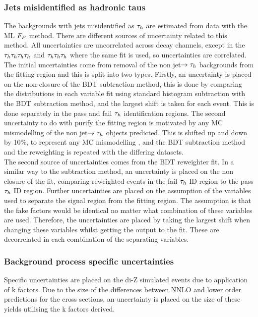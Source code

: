 \subsubsection{Jets misidentified as hadronic taus}
The backgrounds with jets misidentified as $\tau_{h}$ are estimated from data with the \ac{ML} $F_{F}$ method. 
There are different sources of uncertainty related to this method. 
All uncertainties are uncorrelated across decay channels, except in the $\tau_{h}\tau_{h}\tau_{h}\tau_{h}$ and $\tau_{h}\tau_{h}\tau_{h}$ where the same fit is used, so uncertainties are correlated. \\

The initial uncertainties come from removal of the non jet$\rightarrow\tau_{h}$ backgrounds from the fitting region and this is split into two types.
Firstly, an uncertainty is placed on the non-closure of the \ac{BDT} subtraction method, this is done by comparing the distributions in each variable fit using standard histogram subtraction with the \ac{BDT} subtraction method, and the largest shift is taken for each event. This is done separately in the pass and fail $\tau_{h}$ identification regions.
The second uncertainty to do with purify the fitting region is motivated by any \ac{MC} mismodelling of the non jet$\rightarrow\tau_{h}$ objects predicted.
This is shifted up and down by 10\%, to represent any \ac{MC} mismodelling , and the \ac{BDT} subtraction method and the reweighting is repeated with the differing datasets. \\

The second source of uncertainties comes from the \ac{BDT} reweighter fit.
In a similar way to the subtraction method, an uncertainty is placed on the non closure of the fit, comparing reweighted events in the fail $\tau_{h}$ ID region to the pass $\tau_{h}$ ID region.
Further uncertainties are placed on the assumption of the variables used to separate the signal region from the fitting region.
The assumption is that the fake factors would be identical no matter what combination of these variables are used.
Therefore, the uncertainties are placed by taking the largest shift when changing these variables whilst getting the output to the fit.
These are decorrelated in each combination of the separating variables.

\subsubsection{Background process specific uncertainties}
Specific uncertainties are placed on the di-Z simulated events due to application of k factors.
Due to the size of the differences between \ac{NNLO} and lower order predictions for the cross sections, an uncertainty is placed on the size of these yields utilising the k factors derived.

